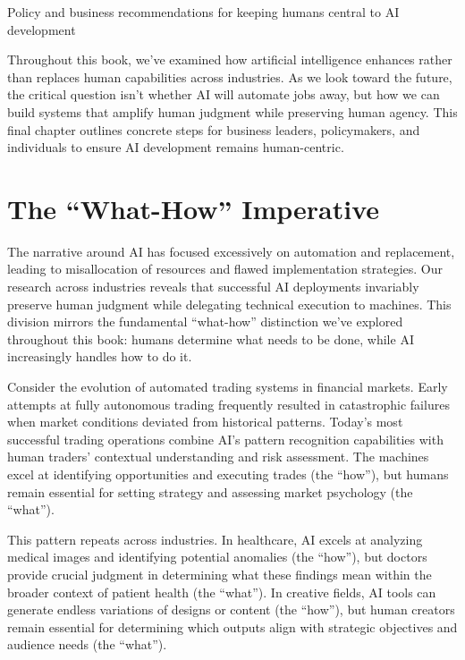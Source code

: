 \documentclass[
  Letterpaper,
]{scrbook}
\begin{document}
Policy and business recommendations for keeping humans central to AI
development

\hfill\break

Throughout this book, we've examined how artificial
intelligence enhances rather
than replaces human
capabilities across
industries. As we look toward the future, the critical question isn't
whether AI will automate jobs away, but how we can build systems that
amplify human judgment while
preserving human agency. This
final chapter outlines concrete steps for business leaders,
policymakers, and individuals to ensure AI development remains
human-centric.

\section{The ``What-How'' Imperative}\label{the-what-how-imperative}

The narrative around AI has focused excessively on
automation and replacement, leading to
misallocation of resources and flawed implementation strategies. Our
research across industries reveals that successful AI deployments
invariably preserve human judgment while delegating technical execution
to machines. This division mirrors the fundamental ``what-how''
distinction we've explored throughout this book: humans determine what
needs to be done, while AI increasingly handles how to do it.

Consider the evolution of automated trading systems in financial
markets. Early attempts at fully autonomous trading frequently resulted
in catastrophic failures when market conditions deviated from historical
patterns. Today's most successful trading operations combine AI's
pattern recognition capabilities
with human traders' contextual
understanding and
risk assessment. The machines excel at identifying opportunities and
executing trades (the ``how''), but humans remain essential for setting
strategy and assessing market psychology (the ``what'').

This pattern repeats across industries. In healthcare,
AI excels at analyzing medical images and identifying potential
anomalies (the ``how''), but doctors provide crucial judgment in
determining what these findings mean within the broader context of
patient health (the ``what''). In creative fields, AI tools can generate
endless variations of designs or content (the ``how''), but human
creators remain essential for determining which outputs align with
strategic objectives and audience needs (the ``what'').
\end{document}
